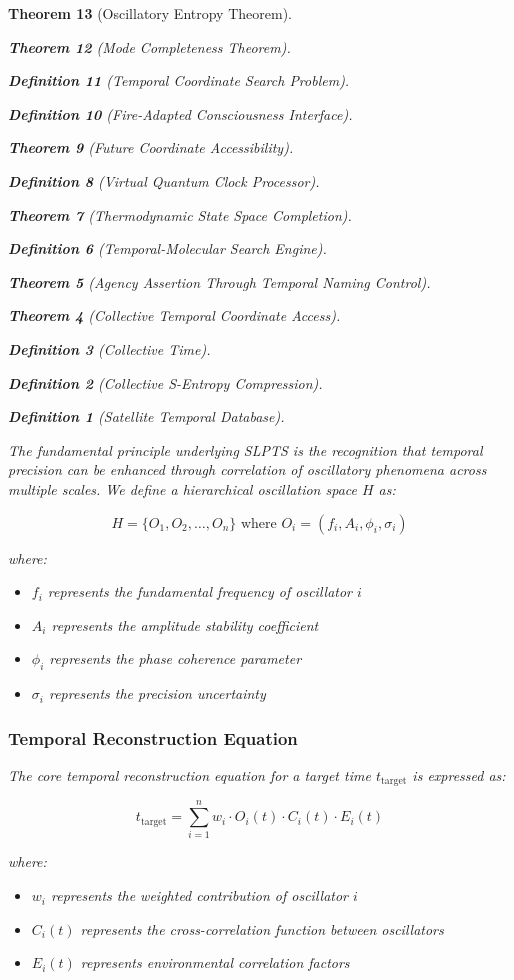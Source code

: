 \documentclass[12pt,a4paper]{article}
\newtheorem{theorem}{Theorem}[section]
\newtheorem{definition}[theorem]{Definition}
\begin{document}
\begin{theorem}[Oscillatory Entropy Theorem]
\begin{theorem}[Mode Completeness Theorem]
\begin{enumerate}
\begin{definition}[Temporal Coordinate Search Problem]
\begin{algorithm}
\begin{definition}[Fire-Adapted Consciousness Interface]
\begin{theorem}[Future Coordinate Accessibility]
\begin{definition}[Virtual Quantum Clock Processor]
\begin{itemize}
\begin{itemize}
\begin{theorem}[Thermodynamic State Space Completion]
\begin{definition}[Temporal-Molecular Search Engine]
\begin{theorem}[Agency Assertion Through Temporal Naming Control]
\begin{remark}
\begin{theorem}[Collective Temporal Coordinate Access]
\begin{definition}[Collective Time]
\begin{definition}[Collective S-Entropy Compression]
\begin{definition}[Satellite Temporal Database]
\begin{algorithm}
\begin{table}[h]
{{The fundamental principle underlying SLPTS is the recognition that temporal precision can be enhanced through correlation of oscillatory phenomena across multiple scales. We define a hierarchical oscillation space $H$ as:

\begin{equation}
H = \{O_1, O_2, \ldots, O_n\} \text{ where } O_i = (f_i, A_i, \phi_i, \sigma_i)
\end{equation}

where:
\begin{itemize}
\item $f_i$ represents the fundamental frequency of oscillator $i$
\item $A_i$ represents the amplitude stability coefficient
\item $\phi_i$ represents the phase coherence parameter
\item $\sigma_i$ represents the precision uncertainty
\end{itemize}

\subsubsection{Temporal Reconstruction Equation}

The core temporal reconstruction equation for a target time $t_{\text{target}}$ is expressed as:

\begin{equation}
t_{\text{target}} = \sum_{i=1}^{n} w_i \cdot O_i(t) \cdot C_i(t) \cdot E_i(t)
\end{equation}

where:
\begin{itemize}
\item $w_i$ represents the weighted contribution of oscillator $i$
\item $C_i(t)$ represents the cross-correlation function between oscillators
\item $E_i(t)$ represents environmental correlation factors
\end{itemize}

}}
\end{table}
\end{algorithm}
\end{definition}
\end{definition}
\end{definition}
\end{theorem}
\end{remark}
\end{theorem}
\end{definition}
\end{theorem}
\end{itemize}
\end{itemize}
\end{definition}
\end{theorem}
\end{definition}
\end{algorithm}
\end{definition}
\end{enumerate}
\end{theorem}
\end{theorem}
\end{document}
